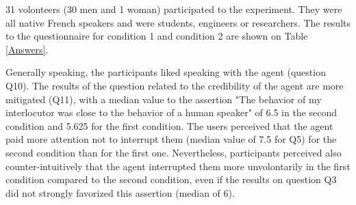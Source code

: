 31 volonteers (30 men and 1 woman) participated to the experiment. They were all native French speakers and were students, engineers or researchers. The results to the questionnaire for condition 1 and condition 2 are shown on Table \ref{Answers}. 
\begin{table}
\centering
{}
\caption{Mean agreements of the participants for conditions 1 and condition 2 (translated from French).}
\label{Answers}
\end{table}

Generally speaking, the participants liked speaking with the agent (question Q10). The results of the question related to the credibility of the agent are more mitigated (Q11), with a median value to the assertion "The behavior of my interlocutor was close to the behavior of a human speaker" of 6.5 in the second condition and 5.625 for the first condition. The users perceived that the agent paid more attention not to interrupt them (median value of 7.5 for Q5) for the second condition than for the first one. Nevertheless, participants perceived also counter-intuitively that the agent interrupted them more unvolontarily in the first condition compared to the second condition, even if the results on question Q3 did not strongly favorized this assertion (median of 6). 

